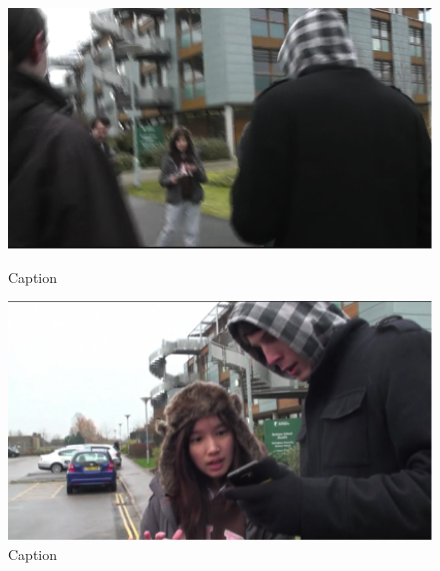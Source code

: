 \begin{figure}[ht]
\centering
\begin{minipage}[b]{0.45\linewidth}
\includegraphics[width=1\textwidth]{img/study1/ep2/ep21}
\caption{Caption}
\label{fig:study2ep21}
\end{minipage}
\quad
\begin{minipage}[b]{0.45\linewidth}
 \includegraphics[width=1\textwidth]{img/study1/ep2/ep22}
\caption{Caption}
\label{fig:study2ep22}
\end{minipage}
\end{figure}

